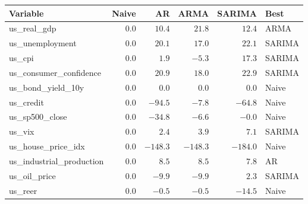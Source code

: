 \begin{tabular}{lrrrrl}
  \toprule
  Variable & Naive & AR & ARMA & SARIMA & Best \\
  \midrule
  us\_real\_gdp & $0.0$ & $10.4$ & $21.8$ & $12.4$ & ARMA \\
  us\_unemployment & $0.0$ & $20.1$ & $17.0$ & $22.1$ & SARIMA \\
  us\_cpi & $0.0$ & $1.9$ & $-5.3$ & $17.3$ & SARIMA \\
  us\_consumer\_confidence & $0.0$ & $20.9$ & $18.0$ & $22.9$ & SARIMA \\
  us\_bond\_yield\_10y & $0.0$ & $0.0$ & $0.0$ & $0.0$ & Naive \\
  us\_credit & $0.0$ & $-94.5$ & $-7.8$ & $-64.8$ & Naive \\
  us\_sp500\_close & $0.0$ & $-34.8$ & $-6.6$ & $-0.0$ & Naive \\
  us\_vix & $0.0$ & $2.4$ & $3.9$ & $7.1$ & SARIMA \\
  us\_house\_price\_idx & $0.0$ & $-148.3$ & $-148.3$ & $-184.0$ & Naive \\
  us\_industrial\_production & $0.0$ & $8.5$ & $8.5$ & $7.8$ & AR \\
  us\_oil\_price & $0.0$ & $-9.9$ & $-9.9$ & $2.3$ & SARIMA \\
  us\_reer & $0.0$ & $-0.5$ & $-0.5$ & $-14.5$ & Naive \\
  \bottomrule
\end{tabular}